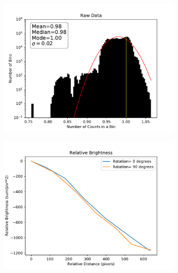\documentclass[preprint]{aastex62}
\begin{document}
    
        \begin{figure}
          \centering
            \includegraphics[width=3.5in]{../images/flat_master_raw.pdf}
            \caption{}
          \label{fig:flat_masterhisto}
        \end{figure}
    
        \begin{figure}
          \centering
            \includegraphics[width=3.5in]{../images/brightness-distance.pdf}
            \caption{}
          \label{fig:brightness-distance}
        \end{figure}
    
\end{document}
